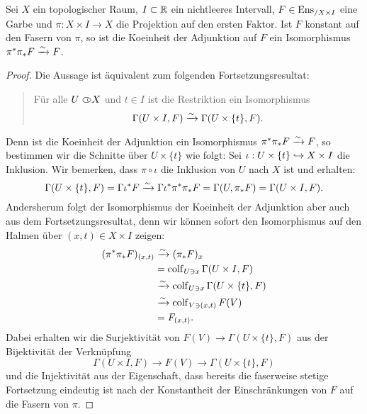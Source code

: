 \begin{lemma}[\cite{TG}, 6.4.17] \label{constant-on-fibers}
  Sei $X$ ein topologischer Raum, $I \subset \mathbb{R}$ ein nichtleeres
  Intervall, $F \in \operatorname{Ens}_{/X \times I}$ eine Garbe und $\pi: X \times
  I \to X$ die Projektion auf den ersten Faktor. Ist $F$ konstant auf
  den Fasern von $\pi$, so ist die Koeinheit der Adjunktion auf $F$
  ein Isomorphismus $\pi^* \pi_* F \xrightarrow[]{\sim} F$.
\end{lemma}
\begin{proof}
  Die Aussage ist äquivalent zum folgenden Fortsetzungsresultat:
  \begin{quote}
    Für alle $U \subset\kern-0.58em\circ X$ und $t \in I$ ist die Restriktion ein
    Isomorphismus
    \[ \Gamma(U \times I, F) \xrightarrow[]{\sim} \Gamma(U \times \{t\}, F). \]
  \end{quote}
  Denn ist die Koeinheit der Adjunktion ein Isomorphismus $\pi^* \pi_*
  F \xrightarrow[]{\sim} F$, so bestimmen wir die Schnitte über $U \times \{t\}$ wie
  folgt: Sei $\iota: U \times \{t\} \hookrightarrow X \times I$ die Inklusion. Wir
  bemerken, dass $\pi \circ \iota$ die Inklusion von $U$ nach $X$ ist
  und erhalten:
  \[ \Gamma(U \times \{t\}, F)
      = \Gamma \iota^* F
      \xrightarrow[]{\sim} \Gamma \iota^* \pi^* \pi_* F
      = \Gamma(U, \pi_* F)
      = \Gamma(U \times I, F). \]
  Andersherum folgt der Isomorphismus der Koeinheit der Adjunktion
  aber auch aus dem Fortsetzungsresultat, denn wir können sofort den
  Isomorphismus auf den Halmen über $(x, t) \in X \times I$ zeigen:
  \begin{align*}
    (\pi^* \pi_* F)_{(x,t)}
    &\xrightarrow[]{\sim} (\pi_* F)_x \\
    &= \operatorname{colf}\limits_{U \ni x} \Gamma(U \times I, F) \\
    &\xrightarrow[]{\sim} \operatorname{colf}\limits_{U \ni x} \Gamma(U \times \{t\}, F) \\
    &\xrightarrow[]{\sim} \operatorname{colf}\limits_{V \ni (x, t)} F(V) \\
    &= F_{(x, t)}.
  \end{align*}
  Dabei erhalten wir die Surjektivität von $F(V) \to \Gamma(U \times
  \{t\}, F)$ aus der Bijektivität der Verknüpfung
  \[ \Gamma(U \times I, F) \to F(V) \to \Gamma(U \times \{t\}, F) \]
  und die Injektivität aus der Eigenschaft, dass bereits die faserweise
  stetige Fortsetzung eindeutig ist nach der Konstantheit der
  Einschränkungen von $F$ auf die Fasern von $\pi$.


\end{proof}
